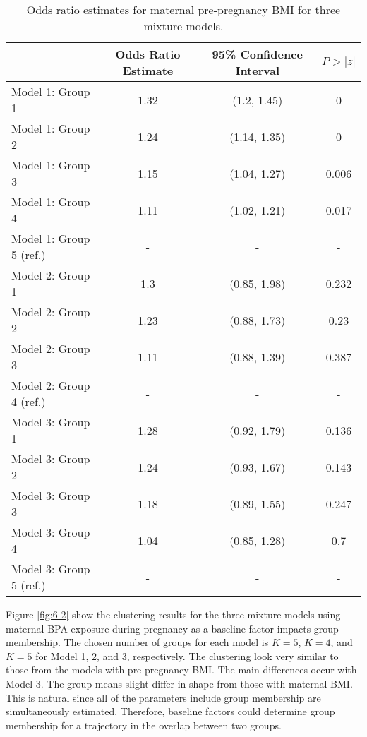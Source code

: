 \begin{table}[ht]
\begin{center}
\begin{tabular}{lccc}
  \hline
 & Odds Ratio Estimate & 95\% Confidence Interval & $P>|z|$ \\ 
  \hline
Model 1: Group  1 & 1.32 & (1.2, 1.45) & 0 \\ 
  Model 1: Group  2 & 1.24 & (1.14, 1.35) & 0 \\ 
  Model 1: Group  3 & 1.15 & (1.04, 1.27) & 0.006 \\ 
  Model 1: Group  4 & 1.11 & (1.02, 1.21) & 0.017 \\ 
  Model 1: Group  5  (ref.) & - & - & - \\ 
  Model 2: Group  1 & 1.3 & (0.85, 1.98) & 0.232 \\ 
  Model 2: Group  2 & 1.23 & (0.88, 1.73) & 0.23 \\ 
  Model 2: Group  3 & 1.11 & (0.88, 1.39) & 0.387 \\ 
  Model 2: Group  4  (ref.) & - & - & - \\ 
  Model 3: Group  1 & 1.28 & (0.92, 1.79) & 0.136 \\ 
  Model 3: Group  2 & 1.24 & (0.93, 1.67) & 0.143 \\ 
  Model 3: Group  3 & 1.18 & (0.89, 1.55) & 0.247 \\ 
  Model 3: Group  4 & 1.04 & (0.85, 1.28) & 0.7 \\ 
  Model 3: Group  5  (ref.) & - & - & - \\ 
   \hline
\end{tabular}
\caption{Odds ratio estimates for maternal pre-pregnancy BMI for three mixture models. }
\end{center}
\label{tab:6-1}
\end{table}

Figure \ref{fig:6-2} show the clustering results for the three mixture models using maternal BPA exposure during pregnancy as a baseline factor impacts group membership. The chosen number of groups for each model is $K = 5$, $K=4$, and $K=5$ for Model 1, 2, and 3, respectively. The clustering look very similar to those from the models with pre-pregnancy BMI. The main differences occur with Model 3. The group means slight differ in shape from those with maternal BMI. This is natural since all of the parameters include group membership are simultaneously estimated. Therefore, baseline factors could determine group membership for a trajectory in the overlap between two groups.

